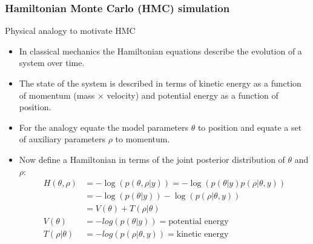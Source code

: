 \documentclass[handout]{beamer}
\begin{document}
\begin{frame}[shrink]
  \frametitle{Hamiltonian Monte Carlo (HMC) simulation}
  
  Physical analogy to motivate HMC
  \begin{itemize}
  \item In classical mechanics the Hamiltonian equations describe the
    evolution of a system over time.
  \item The state of the system is described in terms of kinetic
    energy as a function of momentum (mass $\times$ velocity) and
    potential energy as a function of position.
  \item For the analogy equate the model parameters $\theta$ to
    position and equate a set of auxiliary parameters $\rho$ to
    momentum.
  \item Now define a Hamiltonian in terms of the joint posterior
    distribution of $\theta$ and $\rho$:
    \begin{align*}
      H(\theta, \rho) &= -\log\left(p\left(\theta, \rho | y\right)\right) 
                      = -\log\left(p\left(\theta | y\right)
                        p\left(\rho | \theta, y\right)\right) \\
                      &= -\log\left(p\left(\theta | y\right)\right)
                        - \log\left(p\left(\rho | \theta,
                        y\right)\right) \\
                      &= V\left(\theta\right) + T\left(\rho |
                        \theta\right) \\
      V\left(\theta\right) &= -log\left(p\left(\theta | y\right)\right)
                             = \text{potential energy} \\
      T\left(\rho | \theta\right) &= - log\left(p\left(\rho | \theta,  y\right)\right) = \text{kinetic energy}
    \end{align*}
  \end{itemize}

\end{frame}
\end{document}
